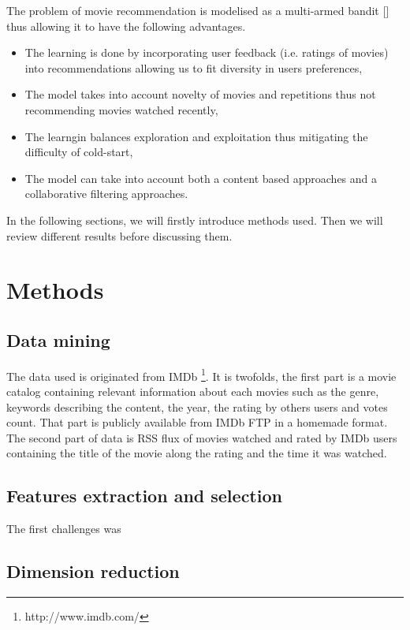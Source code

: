 \documentclass[letterpaper]{article}
\begin{document}
The problem of movie recommendation is modelised as a multi-armed bandit [\cite{sutton1998reinforcement}] thus allowing it to have the following advantages. 

\begin{itemize}
	\item The learning is done by incorporating user feedback (i.e. ratings of movies) into recommendations allowing us to fit diversity in users preferences,
	\item The model takes into account novelty of movies and repetitions thus not recommending movies watched recently,
	\item The learngin balances exploration and exploitation thus mitigating the difficulty of cold-start,
	\item The model can take into account both a content based approaches and a collaborative filtering approaches.
\end{itemize}


In the following sections, we will firstly introduce methods used. Then we will review different results before discussing them.

\section{Methods}

\subsection{Data mining}

The data used is originated from IMDb \footnote{http://www.imdb.com/}. It is twofolds, the first part is a movie catalog containing relevant information about each movies such as the genre, keywords describing the content, the year, the rating by others users and votes count. That part is publicly available from IMDb FTP in a homemade format. The second part of data is RSS flux of movies watched and rated by IMDb users containing the title of the movie along the rating and the time it was watched.

\subsection{Features extraction and selection}

The first challenges was


\subsection{Dimension reduction}
\end{document}
